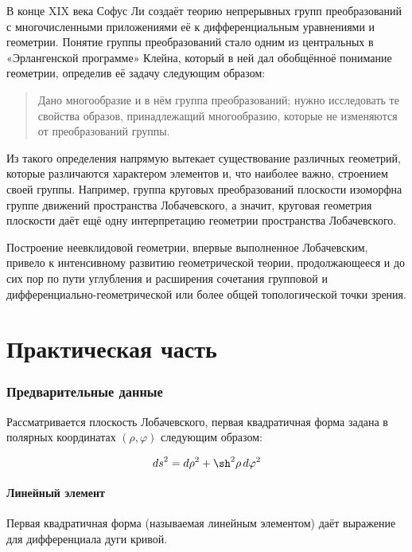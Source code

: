 \documentclass{article}
\numberwithin{equation}{section}
\renewcommand{\phi}{\varphi}
\begin{document}


В конце XIX века Софус Ли создаёт теорию непрерывных групп
преобразований с многочисленными приложениями её к дифференциальным
уравнениями и геометрии. Понятие группы преобразований стало одним из
центральных в «Эрлангенской программе» Клейна, который в ней дал
обобщённоё понимание геометрии, определив её задачу следующим образом:

\begin{quote}
  Дано многообразие и в нём группа преобразований; нужно исследовать
  те свойства образов, принадлежащий многообразию, которые не
  изменяются от преобразований группы.
\end{quote}

Из такого определения напрямую вытекает существование различных
геометрий, которые различаются характером элементов и, что наиболее
важно, строением своей группы. Например, группа круговых
преобразований плоскости изоморфна группе движений пространства
Лобачевского, а значит, круговая геометрия плоскости даёт ещё одну
интерпретацию геометрии пространства Лобачевского.

Построение неевклидовой геометрии, впервые выполненное Лобачевским,
привело к интенсивному развитию геометрической теории, продолжающееся
и до сих пор по пути углубления и расширения сочетания групповой и
дифференциально-геометрической или более общей топологической точки
зрения.

\clearpage
\part{Практическая часть}

\section{Предварительные данные}

Рассматривается плоскость Лобачевского, первая квадратичная форма
задана в полярных координатах $(\rho, \phi)$ следующим образом:

\begin{equation}\label{eq:lin-elt}
  {ds}^2 = d\rho^2+\sh^2{\rho}\,d\phi^2
\end{equation}

\subsection{Линейный элемент}

Первая квадратичная форма (называемая линейным элементом) даёт
выражение для дифференциала дуги кривой.
\end{document}
